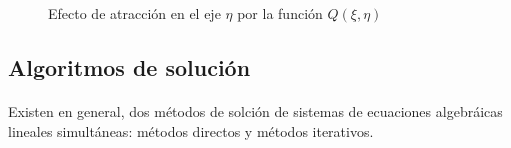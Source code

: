 \documentclass[letterpaper, openright, 12pt]{book}
\begin{document}
			\begin{figure}[htbp!]
				\centering
				\hspace{1cm}
				\caption[Efecto de atracción por función $Q(\xi,\eta)$]{Efecto de atracción en el eje $\eta$ por la función $Q(\xi, \eta)$}
				\label{fig:densidad-eta}
			\end{figure}
			
		\subsection{Algoritmos de solución}
			\paragraph*{}
				Existen en general, dos métodos de solción de sistemas de ecuaciones algebráicas lineales simultáneas: métodos directos y métodos iterativos.
			
\end{document}
